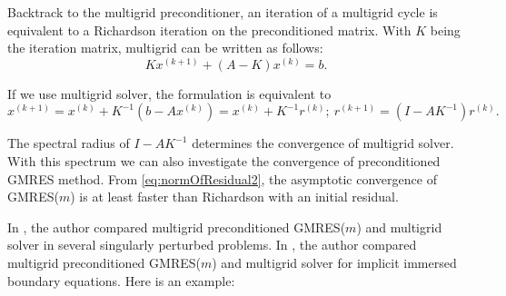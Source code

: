 Backtrack to the multigrid preconditioner, an iteration of a multigrid
cycle is equivalent to a Richardson iteration on  the preconditioned
matrix\cite{oosterlee_evaluation_1998}. With $K$ being the iteration
matrix, multigrid
can be written as follows:
\begin{equation}
  \label{eq:RichardsonIter}
  Kx^{(k+1)}+(A-K)x^{(k)}=b.
\end{equation}

If we use multigrid solver, the formulation is equivalent to
\begin{equation}
  \label{eq:Richardson2}
  x^{(k+1)} = x^{(k)} + K^{-1}(b-Ax^{(k)}) = x^{(k)}+K^{-1}r^{(k)};\
  r^{(k+1)} = (I-AK^{-1})r^{(k)}.
\end{equation}

The spectral radius of $I-AK^{-1}$ determines the convergence of
multigrid solver. With
this spectrum we can also investigate the convergence of
preconditioned GMRES method. From \eqref{eq:normOfResidual2}, the asymptotic
convergence of GMRES($m$) is at least faster than Richardson with an initial
residual. 

In \cite{oosterlee_evaluation_1998}, the author compared multigrid preconditioned
GMRES($m$) and multigrid solver in several singularly perturbed
problems. In \cite{guy_multigrid_2012}, the author compared multigrid
preconditioned GMRES($m$) and multigrid solver for implicit immersed
boundary equations. Here is an example:

